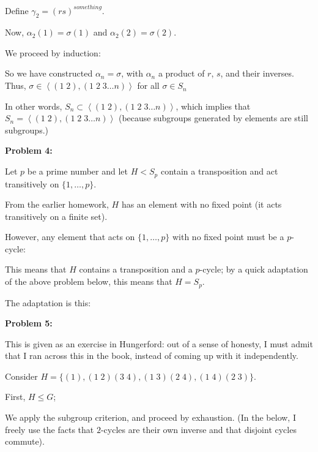 \documentclass[a4paper,12pt]{article}
\newcommand{\tab}{\hspace{4mm}} %
\newcommand{\shunt}{\vspace{20mm}}
\newcommand{\anbrack}[1]{\left\langle #1 \right\rangle}
\newcommand{\al}{\alpha} %
\newcommand{\ga}{\gamma}
\begin{document}
\shunt %

\tab Define $\ga_2 = (rs)^{something}$.

\shunt %

\tab Now, $\al_2(1) = \sigma(1)$ and $\al_2(2) = \sigma(2)$.

\tab We proceed by induction:

\tab %

\tab So we have constructed $\al_n = \sigma$, with $\al_n$ a product of $r$, $s$, and their inverses. Thus, $\sigma \in \anbrack{(1 \; 2) , (1 \; 2 \; 3 \ldots n)}$ for all $\sigma \in S_n$

In other words, $S_n \subset \anbrack{(1 \; 2) , (1 \; 2 \; 3 \ldots n)}$, which implies that $S_n = \anbrack{(1 \; 2) , (1 \; 2 \; 3 \ldots n)}$ (because subgroups generated by elements are still subgroups.)

\shunt

{\bf Problem 4:}

Let $p$ be a prime number and let $H<S_p$ contain a transposition and act transitively on $\{1,\ldots,p\}$.

From the earlier homework, $H$ has an element with no fixed point (it acts transitively on a finite set).

However, any element that acts on $\{1, \ldots, p\}$ with no fixed point must be a $p$-cycle:

\tab %

This means that $H$ contains a transposition and a $p$-cycle; by a quick adaptation of the above problem below, this means that $H = S_p$.

The adaptation is this: %

\shunt

{\bf Problem 5:}

This is given as an exercise in Hungerford: out of a sense of honesty, I must admit that I ran across this in the book, instead of coming up with it independently.

Consider $ H =\{(1), (1 \; 2)(3 \; 4), (1 \; 3) (2 \; 4), (1 \; 4) (2 \; 3)\}$.

First, $H \leq G$;

\tab We apply the subgroup criterion, and proceed by exhaustion. (In the below, I freely use the facts that $2$-cycles are their own inverse and that disjoint cycles commute).
\end{document}
